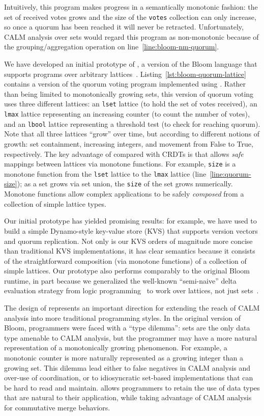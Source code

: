 Intuitively, this program makes progress in a semantically monotonic fashion:
the set of received votes grows and the size of the \texttt{votes} collection
can only increase, so once a quorum has been reached it will never be
retracted. Unfortunately, CALM analysis over sets would regard this program as
non-monotonic because of the grouping/aggregation operation on
line~\ref{line:bloom-nm-quorum}.

We have developed an initial prototype of \blooml, a version of the Bloom
language that supports programs over arbitrary
lattices~\cite{bloom-lattice-tr}. Listing~\ref{lst:bloom-quorum-lattice}
contains a version of the quorum voting program implemented using
\blooml. Rather than being limited to monotonically growing sets, this version
of quorum voting uses three different lattices: an \texttt{lset} lattice (to
hold the set of votes received), an \texttt{lmax} lattice representing an
increasing counter (to count the number of votes), and an \texttt{lbool} lattice
representing a threshold test (to check for reaching quorum). Note that all
three lattices ``grow'' over time, but according to different notions of growth:
set containment, increasing integers, and movement from False to True,
respectively. The key advantage of \blooml compared with CRDTs is that \blooml
allows \emph{safe} mappings between lattices via monotone functions. For
example, \texttt{size} is a monotone function from the \texttt{lset} lattice to
the \texttt{lmax} lattice (line~\ref{line:quorum-size}); as a set grows via set
union, the \texttt{size} of the set grows numerically. Monotone functions allow
complex applications to be safely \emph{composed} from a collection of simple
lattice types.

Our initial \blooml prototype has yielded promising results: for example, we
have used \blooml to build a simple Dynamo-style key-value store (KVS) that supports version
vectors and quorum replication. Not only is our KVS orders of magnitude more
concise than traditional KVS implementations, it has clear semantics because it
consists of the straightforward composition (via monotone functions) of a
collection of simple lattices. Our \blooml prototype also performs comparably to
the original Bloom runtime, in part because we generalized the well-known
``semi-naive'' delta evaluation strategy from logic
programming~\cite{Balbin1987} to work over lattices, not just
sets~\cite{bloom-lattice-tr}.

The design of \blooml represents an important direction for extending the reach of CALM analysis into more traditional programming styles.  In the original version of Bloom, programmers were faced with a ``type dilemma'': sets are the only data type amenable to CALM analysis, but the programmer may have a more natural representation of a monotonically growing phenomenon. For example, a monotonic counter is more naturally represented as a growing integer than a growing set. This dilemma lead either to false negatives in CALM analysis and over-use of coordination, or to idiosyncratic set-based implementations that can be hard to read and maintain.  \blooml allows programmers to retain the use of data types that are natural to their application, while taking advantage of CALM analysis for commutative merge behaviors.

